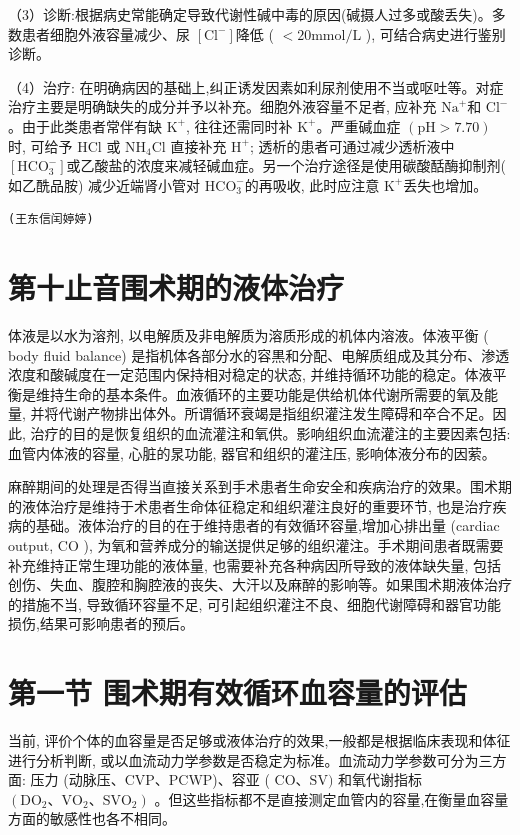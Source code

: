 \documentclass[10pt]{article}
\begin{document}
（3）诊断:根据病史常能确定导致代谢性碱中毒的原因(碱摄人过多或酸丢失)。多数患者细胞外液容量减少、尿 $\left[\mathrm{Cl}^{-}\right]$降低 ( $<20 \mathrm{mmol} / \mathrm{L}$ ), 可结合病史进行鉴别诊断。

（4）治疗: 在明确病因的基础上,纠正诱发因素如利尿剂使用不当或呕吐等。对症治疗主要是明确缺失的成分并予以补充。细胞外液容量不足者, 应补充 $\mathrm{Na}^{+}$和 $\mathrm{Cl}^{-}$。由于此类患者常伴有缺 $\mathrm{K}^{+}$, 往往还需同时补 $\mathrm{K}^{+}$。严重碱血症 $(\mathrm{pH}>7.70)$ 时, 可给予 $\mathrm{HCl}$ 或 $\mathrm{NH}_{4} \mathrm{Cl}$ 直接补充 $\mathrm{H}^{+}$; 透析的患者可通过减少透析液中 $\left[\mathrm{HCO}_{3}^{-}\right]$或乙酸盐的浓度来减轻碱血症。另一个治疗途径是使用碳酸䣶酶抑制剂( 如乙酰品胺) 减少近端肾小管对 $\mathrm{HCO}_{3}^{-}$的再吸收, 此时应注意 $\mathrm{K}^{+}$丢失也增加。

\begin{verbatim}
(王东信闰婷婷)
\end{verbatim}

\section*{第十止音围术期的液体治疗}
体液是以水为溶剂, 以电解质及非电解质为溶质形成的机体内溶液。体液平衡 ( body fluid balance) 是指机体各部分水的容黒和分配、电解质组成及其分布、渗透浓度和酸碱度在一定范围内保持相对稳定的状态, 并维持循环功能的稳定。体液平衡是维持生命的基本条件。血液循环的主要功能是供给机体代谢所需要的氧及能量, 并将代谢产物排出体外。所谓循环衰竭是指组织灌注发生障碍和卒合不足。因此, 治疗的目的是恢复组织的血流灌注和氧供。影响组织血流灌注的主要因素包括: 血管内体液的容量, 心脏的㫤功能, 器官和组织的灌注压, 影响体液分布的因萦。

麻醉期间的处理是否得当直接关系到手术患者生命安全和疾病治疗的效果。围术期的液体治疗是维持于术患者生命体征稳定和组织灌注良好的重要环节, 也是治疗疾病的基础。液体治疗的目的在于维持患者的有效循环容量,增加心排出量 (cardiac output, $\mathrm{CO}$ ), 为氧和营养成分的输送提供足够的组织灌注。手术期间患者既需要补充维持正常生理功能的液体量, 也需要补充各种病因所导致的液体缺失量, 包括创伤、失血、腹腔和胸腔液的丧失、大汗以及麻醉的影响等。如果围术期液体治疗的措施不当, 导致循环容量不足, 可引起组织灌注不良、细胞代谢障碍和器官功能损伤,结果可影响患者的预后。

\section*{第一节 围术期有效循环血容量的评估}
当前, 评价个体的血容量是否足够或液体治疗的效果,一般都是根据临床表现和体征进行分析判断, 或以血流动力学参数是否稳定为标准。血流动力学参数可分为三方面: 压力 (动脉压、CVP、PCWP)、容亚 ( $\mathrm{CO} 、 \mathrm{SV})$ 和氧代谢指标 $\left(\mathrm{DO}_{2} 、 \mathrm{VO}_{2} 、 \mathrm{SVO}_{2}\right)$ 。但这些指标都不是直接测定血管内的容量,在衡量血容量方面的敏感性也各不相同。
\end{document}
